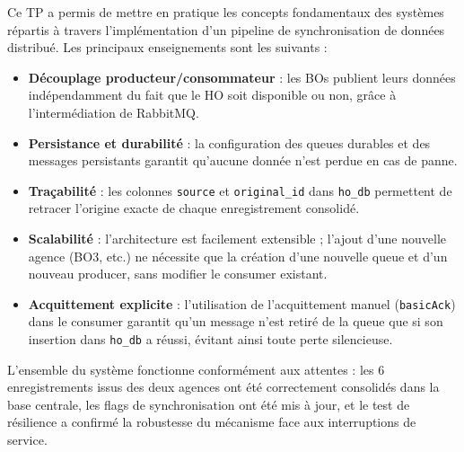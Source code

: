 \documentclass[a4paper,12pt]{article}
\begin{document}
Ce TP a permis de mettre en pratique les concepts fondamentaux des systèmes répartis à travers l'implémentation d'un pipeline de synchronisation de données distribué. Les principaux enseignements sont les suivants :

\begin{itemize}
    \item \textbf{Découplage producteur/consommateur} : les BOs publient leurs données indépendamment du fait que le HO soit disponible ou non, grâce à l'intermédiation de RabbitMQ.
    \item \textbf{Persistance et durabilité} : la configuration des queues durables et des messages persistants garantit qu'aucune donnée n'est perdue en cas de panne.
    \item \textbf{Traçabilité} : les colonnes \texttt{source} et \texttt{original\_id} dans \texttt{ho\_db} permettent de retracer l'origine exacte de chaque enregistrement consolidé.
    \item \textbf{Scalabilité} : l'architecture est facilement extensible ; l'ajout d'une nouvelle agence (BO3, etc.) ne nécessite que la création d'une nouvelle queue et d'un nouveau producer, sans modifier le consumer existant.
    \item \textbf{Acquittement explicite} : l'utilisation de l'acquittement manuel (\texttt{basicAck}) dans le consumer garantit qu'un message n'est retiré de la queue que si son insertion dans \texttt{ho\_db} a réussi, évitant ainsi toute perte silencieuse.
\end{itemize}

L'ensemble du système fonctionne conformément aux attentes : les 6 enregistrements issus des deux agences ont été correctement consolidés dans la base centrale, les flags de synchronisation ont été mis à jour, et le test de résilience a confirmé la robustesse du mécanisme face aux interruptions de service.
\end{document}
